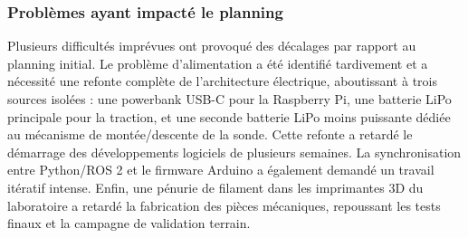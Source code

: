 \subsubsection*{Problèmes ayant impacté le planning}

Plusieurs difficultés imprévues ont provoqué des décalages par rapport au planning initial. Le problème d'alimentation a été identifié tardivement et a nécessité une refonte complète de l'architecture électrique, aboutissant à trois sources isolées : une powerbank USB-C pour la Raspberry Pi, une batterie LiPo principale pour la traction, et une seconde batterie LiPo moins puissante dédiée au mécanisme de montée/descente de la sonde. Cette refonte a retardé le démarrage des développements logiciels de plusieurs semaines. La synchronisation entre Python/ROS 2 et le firmware Arduino a également demandé un travail itératif intense. Enfin, une pénurie de filament dans les imprimantes 3D du laboratoire a retardé la fabrication des pièces mécaniques, repoussant les tests finaux et la campagne de validation terrain.
